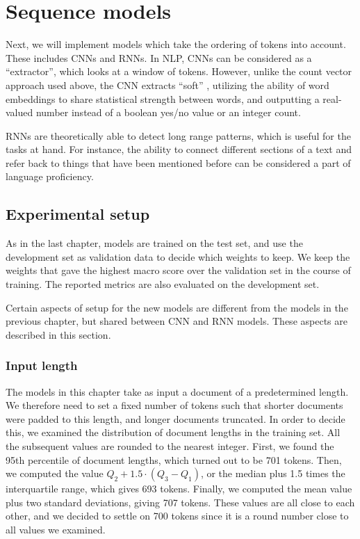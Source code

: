 \chapter{Sequence models}

Next, we will implement models which take the ordering of tokens into
account. These includes \acp{CNN} and \acp{RNN}. In \ac{NLP}, \acp{CNN} can
be considered as a ``\ngram extractor'', which looks at a window of tokens.
However, unlike the count vector approach used above, the CNN extracts
``soft'' \ngrams, utilizing the ability of word embeddings to share
statistical strength between words, and outputting a real-valued number
instead of a boolean yes/no value or an integer count.

\acp{RNN} are theoretically able to detect long range patterns, which is
useful for the tasks at hand. For instance, the ability to connect different
sections of a text and refer back to things that have been mentioned before
can be considered a part of language proficiency.


\section{Experimental setup}

As in the last chapter, models are trained on the test set, and use the
development set as validation data to decide which weights to keep. We keep
the weights that gave the highest macro \FI score over the validation set in
the course of training. The reported metrics are also evaluated on the
development set.

Certain aspects of setup for the new models are different from the models in
the previous chapter, but shared between \ac{CNN} and \ac{RNN} models. These
aspects are described in this section.


\subsection{Input length}

The models in this chapter take as input a document of a predetermined
length. We therefore need to set a fixed number of tokens such that shorter
documents were padded to this length, and longer documents truncated. In
order to decide this, we examined the distribution of document lengths in the
training set. All the subsequent values are rounded to the nearest integer.
First, we found the 95th percentile of document lengths, which turned out to
be 701 tokens. Then, we computed the value $Q_2 + 1.5 \cdot (Q_3 - Q_1)$, or
the median plus 1.5 times the interquartile range, which gives 693 tokens.
Finally, we computed the mean value plus two standard deviations, giving 707
tokens. These values are all close to each other, and we decided to settle on
700 tokens since it is a round number close to all values we examined.

